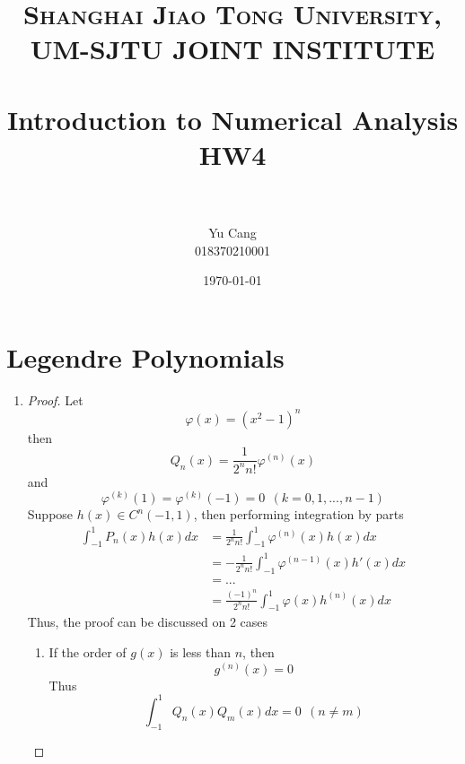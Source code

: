 \documentclass[paper=a4, fontsize=11pt]{scrartcl} %
\title{	
\normalfont \normalsize 
\textsc{Shanghai Jiao Tong University, UM-SJTU JOINT INSTITUTE} \\ [25pt] %
\horrule{0.5pt} \\[0.4cm] %
\huge Introduction to Numerical Analysis \\ HW4 \\ %
\horrule{2pt} \\[0.5cm] %
}
\author{Yu Cang \\ 018370210001} %
\date{\normalsize \today} %
\numberwithin{equation}{section} %
\numberwithin{figure}{section} %
\numberwithin{table}{section} %
\begin{document}
\maketitle %

\section{Legendre Polynomials}
	\begin{enumerate}
		\item
			\begin{proof}
				Let
				\begin{equation}
					\varphi(x) = (x^2-1)^n
				\end{equation}
				then
				\begin{equation}
					Q_n(x) = \frac{1}{2^n n!}\varphi^{(n)}(x)
				\end{equation}
				and
				\begin{equation}
					\varphi^{(k)}(1) = \varphi^{(k)}(-1) = 0 \ \  (\text{$k=0,1, ... , n-1$})
				\end{equation}
				Suppose $h(x) \in C^n(-1,1)$, then performing integration by parts
				\begin{equation}
					\begin{aligned}
						\int_{-1}^{1} P_n(x)h(x)dx 
						& = \frac{1}{2^n n!}\int_{-1}^{1}\varphi^{(n)}(x)h(x)dx \\
						& = -\frac{1}{2^n n!} \int_{-1}^{1}\varphi^{(n-1)}(x)h'(x)dx \\
						& = ...\\
						& = \frac{(-1)^n}{2^n n!}\int_{-1}^{1}\varphi(x)h^{(n)}(x)dx
					\end{aligned}
				\end{equation}
				Thus, the proof can be discussed on 2 cases
				
				\begin{enumerate}
					\item 
						If the order of $g(x)$ is less than $n$, then 
						\begin{equation}
							g^{(n)}(x) = 0
						\end{equation}
						Thus
						\begin{equation}
							\int_{-1}^{1}Q_n(x)Q_m(x)dx = 0 \ \ (\text{$n\neq m$})
						\end{equation}
											

\end{enumerate}
\end{proof}
\end{enumerate}
\end{document}
